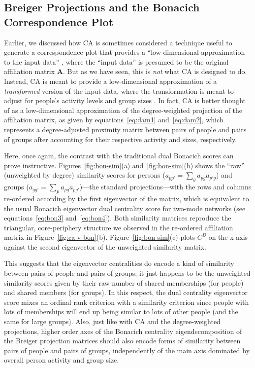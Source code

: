 \documentclass[a4paper,fleqn]{cas-sc}
\begin{document}
\subsection{Breiger Projections and the Bonacich Correspondence Plot} \label{sec:eigplot}
Earlier, we discussed how CA is sometimes considered a technique useful to generate a correspondence plot that provides a ``low-dimensional approximation to the input data'' \citep[125]{faust2005using}, where the ``input data'' is presumed to be the original affiliation matrix $\mathbf{A}$. But as we have seen, this is \textit{not} what CA is designed to do. Instead, CA is meant to provide a low-dimensional approximation of a \textit{transformed} version of the input data, where the transformation is meant to adjust for people's activity levels and group sizes \citep{desposito2014comparison}. In fact, CA is better thought of as a low-dimensional approximation of the degree-weighted projection of the affiliation matrix, as given by equations~\ref{eq:dam1} and~\ref{eq:dam2}, which represents a degree-adjusted proximity matrix between pairs of people and pairs of groups after accounting for their respective activity and sizes, respectively.

Here, once again, the contrast with the traditional dual Bonacich scores can prove instructive. Figures~\ref{fig:bon-sim}(a) and~\ref{fig:bon-sim}(b) shows the ``raw'' (unweighted by degree) similarity scores for persons ($a_{pp'} = \sum_g a_{pg}a_{p'g}$) and groups ($a_{gg'} = \sum_p a_{pg}a_{pg'}$)---the standard \citet{breiger1974duality} projections---with the rows and columns re-ordered according by the first eigenvector of the matrix, which is equivalent to the usual Bonacich eigenvector dual centrality score for two-mode networks (see equations~\ref{eq:bon3} and~\ref{eq:bon4}). Both similarity matrices reproduce the triangular, core-periphery structure we observed in the re-ordered affiliation matrix in Figure~\ref{fig:ca-v-bon}(b). Figure~\ref{fig:bon-sim}(c) plots $C^B$ on the x-axis against the second eigenvector of the unweighted similarity matrix. 

This suggests that the eigenvector centralities do encode a kind of similarity between pairs of people and pairs of groups; it just happens to be the unweighted similarity scores given by their raw number of shared memberships (for people) and shared members (for groups). In this respect, the dual centrality eigenvector score mixes an ordinal rank criterion with a similarity criterion since people with lots of memberships will end up being similar to lots of other people (and the same for large groups). Also, just like with CA and the degree-weighted projections, higher order axes of the Bonacich centrality eigendecomposition of the Breiger projection matrices should also encode forms of similarity between pairs of people and pairs of groups, independently of the main axis dominated by overall person activity and group size.  
\end{document}
